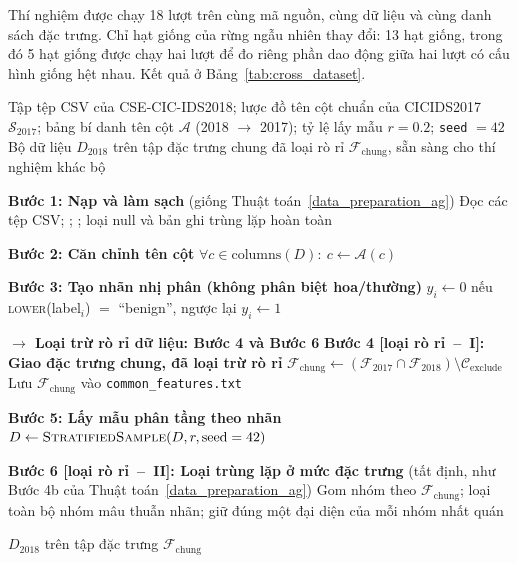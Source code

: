 Thí nghiệm được chạy 18 lượt trên cùng mã nguồn, cùng dữ liệu và cùng danh sách đặc trưng. Chỉ hạt giống của rừng ngẫu nhiên thay đổi: 13 hạt giống, trong đó 5 hạt giống được chạy hai lượt để đo riêng phần dao động giữa hai lượt có cấu hình giống hệt nhau. Kết quả ở Bảng~\ref{tab:cross_dataset}.

\begin{algorithm}[htbp]
\caption{Tiền xử lý và căn chỉnh CSE-CIC-IDS2018 cho đánh giá liên bộ dữ liệu}
\label{alg:prep_2018}
\begin{algorithmic}[1]
\Require Tập tệp CSV của CSE-CIC-IDS2018; lược đồ tên cột chuẩn của CICIDS2017 $\mathcal{S}_{2017}$;
\Statex \qquad bảng bí danh tên cột $\mathcal{A}$ (2018 $\rightarrow$ 2017); tỷ lệ lấy mẫu $r = 0.2$; \texttt{seed} $= 42$
\Ensure Bộ dữ liệu $D_{2018}$ trên tập đặc trưng chung đã loại rò rỉ $\mathcal{F}_{\text{chung}}$, sẵn sàng cho thí nghiệm khác bộ

\State \textbf{Bước 1: Nạp và làm sạch} (giống Thuật toán~\ref{data_preparation_ag})
\State Đọc các tệp CSV; ; ; loại null và bản ghi trùng lặp hoàn toàn

\State \textbf{Bước 2: Căn chỉnh tên cột}
\State $\forall c \in \text{columns}(D):\ c \gets \mathcal{A}(c)$ 

\State \textbf{Bước 3: Tạo nhãn nhị phân (không phân biệt hoa/thường)}
\State $y_i \gets 0$ nếu \textsc{lower}(label$_i$) $=$ ``benign'', ngược lại $y_i \gets 1$ 

\Statex \textcolor{accRed}{\textbf{$\rightarrow$ Loại trừ rò rỉ dữ liệu: Bước 4 và Bước 6}}
\State \textbf{Bước 4 [loại rò rỉ~--~I]: Giao đặc trưng chung, đã loại trừ rò rỉ}
\State $\mathcal{F}_{\text{chung}} \gets (\mathcal{F}_{2017} \cap \mathcal{F}_{2018}) \setminus \mathcal{C}_{\text{exclude}}$ 
\State Lưu $\mathcal{F}_{\text{chung}}$ vào \texttt{common\_features.txt} 

\State \textbf{Bước 5: Lấy mẫu phân tầng theo nhãn}
\State $D \gets \Call{StratifiedSample}{D, r, \text{seed}=42}$ 

\State \textbf{Bước 6 [loại rò rỉ~--~II]: Loại trùng lặp ở mức đặc trưng} (tất định, như Bước 4b của Thuật toán~\ref{data_preparation_ag})
\State Gom nhóm theo $\mathcal{F}_{\text{chung}}$; loại toàn bộ nhóm mâu thuẫn nhãn; giữ đúng một đại diện của mỗi nhóm nhất quán 

\State \Return $D_{2018}$ trên tập đặc trưng $\mathcal{F}_{\text{chung}}$
\end{algorithmic}
\end{algorithm}

